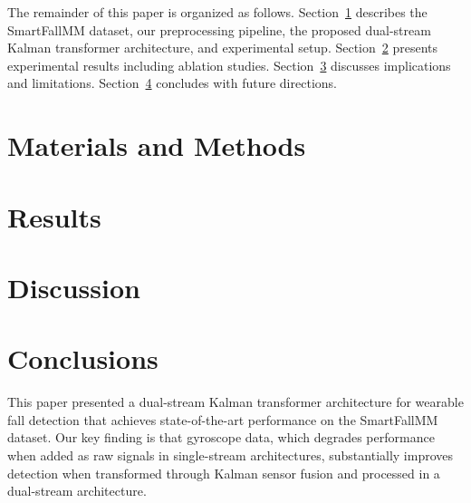 \documentclass[journal,article,submit,pdftex,moreauthors]{Definitions/mdpi}
\begin{document}
The remainder of this paper is organized as follows. Section~\ref{sec:materials} describes the SmartFallMM dataset, our preprocessing pipeline, the proposed dual-stream Kalman transformer architecture, and experimental setup. Section~\ref{sec:results} presents experimental results including ablation studies. Section~\ref{sec:discussion} discusses implications and limitations. Section~\ref{sec:conclusions} concludes with future directions.

\section{Materials and Methods}
\label{sec:materials}



\section{Results}
\label{sec:results}



\section{Discussion}
\label{sec:discussion}



\section{Conclusions}
\label{sec:conclusions}

This paper presented a dual-stream Kalman transformer architecture for wearable fall detection that achieves state-of-the-art performance on the SmartFallMM dataset. Our key finding is that gyroscope data, which degrades performance when added as raw signals in single-stream architectures, substantially improves detection when transformed through Kalman sensor fusion and processed in a dual-stream architecture.
\end{document}
